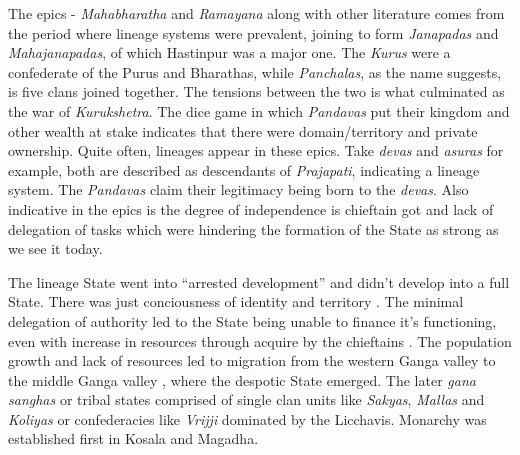\documentclass[a4paper]{article}
\begin{document}
The epics - \textit{Mahabharatha} and \textit{Ramayana} along with other
literature comes from the period where lineage systems were prevalent,
joining to form \textit{Janapadas} and \textit{Mahajanapadas}, of which
Hastinpur was a major one.  The \textit{Kurus} were a confederate of the
Purus and Bharathas, while \textit{Panchalas}, as the name suggests, is
five clans joined together.  The tensions between the two is what
culminated as the war of \textit{Kurukshetra}. The dice game in which
\textit{Pandavas} put their kingdom and other wealth at stake indicates
that there were domain/territory and private ownership. Quite often,
lineages appear in these epics. Take \textit{devas} and \textit{asuras}
for example, both are described as descendants of \textit{Prajapati},
indicating a lineage system. The \textit{Pandavas} claim their
legitimacy being born to the \textit{devas}. Also indicative in the
epics is the degree of independence is chieftain got and lack of
delegation of tasks which were hindering the formation of the State as
strong as we see it today.


The lineage State went into ``arrested development'' \cite[p.
67]{thapar1984lineage} and didn't develop into a full State. There was
just conciousness of identity and territory \cite[p.
67]{thapar1984lineage}.  The minimal delegation of authority led to the
State being unable to finance it's functioning, even with increase in
resources through acquire by the chieftains \cite[p.
67]{thapar1984lineage} . The population growth and lack of resources led
to migration from the western Ganga valley to the middle Ganga valley
\cite[p. 77]{thapar1984lineage}, where the despotic State emerged. 
The later \textit{gana sanghas} or tribal states comprised of single
clan units like \textit{Sakyas}, \textit{Mallas} and \textit{Koliyas} or
confederacies like \textit{Vrijji} dominated by the {Licchavis}.
Monarchy was established first in Kosala and Magadha. 
\end{document}
